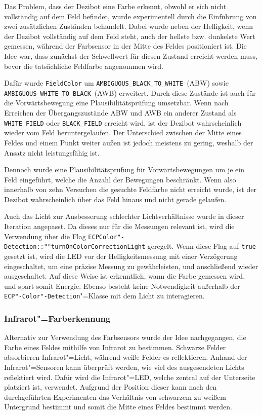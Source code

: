 Das Problem, dass der Dezibot eine Farbe erkennt, obwohl er sich nicht vollständig auf dem Feld befindet, wurde experimentell durch die Einführung von zwei zusätzlichen Zuständen behandelt. Dabei wurde neben der Helligkeit, wenn der Dezibot vollständig auf dem Feld steht, auch der hellste bzw. dunkelste Wert gemessen, während der Farbsensor in der Mitte des Feldes positioniert ist. Die Idee war, dass zunächst der Schwellwert für diesen Zustand erreicht werden muss, bevor die tatsächliche Feldfarbe angenommen wird.

Dafür wurde \texttt{Field\-Color} um \texttt{AMBIGUOUS\_BLACK\_TO\_WHITE}~(ABW) sowie \texttt{AMBIGUOUS\_WHITE\_TO\_BLACK}~(AWB) erweitert. Durch diese Zustände ist auch für die Vorwärtsbewegung eine Plausibilitätsprüfung umsetzbar. Wenn nach Erreichen der Übergangszustände ABW und AWB ein anderer Zustand als \texttt{WHITE\_FIELD} oder \texttt{BLACK\_FIELD} erreicht wird, ist der Dezibot wahrscheinlich wieder vom Feld heruntergelaufen. Der Unterschied zwischen der Mitte eines Feldes und einem Punkt weiter außen ist jedoch meistens zu gering, weshalb der Ansatz nicht leistungsfähig ist. 

Dennoch wurde eine Plausibilitätsprüfung für Vorwärtsbewegungen um je ein Feld eingeführt, welche die Anzahl der Bewegungen beschränkt. Wenn also innerhalb von zehn Versuchen die gesuchte Feldfarbe nicht erreicht wurde, ist der Dezibot wahrscheinlich über das Feld hinaus und nicht gerade gelaufen.

Auch das Licht zur Ausbesserung schlechter Lichtverhältnisse wurde in dieser Iteration angepasst. Da dieses nur für die Messungen relevant ist, wird die Verwendung über die Flag \texttt{ECP\-Color"-Detection::""turn\-On\-Color\-Correction\-Light} geregelt. Wenn diese Flag auf \texttt{true} gesetzt ist, wird die LED vor der Helligkeitsmessung mit einer Verzögerung eingeschaltet, um eine präzise Messung zu gewährleisten, und anschließend wieder ausgeschaltet. Auf diese Weise ist erkenntlich, wann die Farbe gemessen wird, und spart somit Energie. Ebenso besteht keine Notwendigkeit außerhalb der \texttt{ECP"-Color"-Detection}"=Klasse mit dem Licht zu interagieren.


\subsubsection{Infrarot"=Farberkennung}
\label{sec:colour-calibration-ir}

Alternativ zur Verwendung des Farbsensors wurde der Idee nachgegangen, die Farbe eines Feldes mithilfe von Infrarot zu bestimmen. Schwarze Felder absorbieren Infrarot"=Licht, während weiße Felder es reflektieren. Anhand der Infrarot"=Sensoren kann überprüft werden, wie viel des ausgesendeten Lichts reflektiert wird. Dafür wird die Infrarot"=LED, welche zentral auf der Unterseite platziert ist, verwendet. Aufgrund der Position dieser kann nach den durchgeführten Experimenten das Verhältnis von schwarzem zu weißem Untergrund bestimmt und somit die Mitte eines Feldes bestimmt werden.

